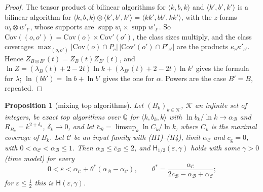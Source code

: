 \documentclass[11pt]{article}
\newtheorem{proposition}[theorem]{Proposition}
\theoremstyle{definition}
\theoremstyle{remark}
\providecommand{\eps}{\varepsilon}
\providecommand{\Q}{\mathbb{Q}}
\newcommand{\abs}[1]{\lvert #1\rvert}
\DeclareMathOperator{\supp}{supp}
\newcommand{\mat}[3]{\langle #1,#2,#3\rangle} %
\newcommand{\Hyp}{\mathsf{H}}                 %
\newcommand{\Hypk}[1]{\mathsf{H}_{#1}}        %
\newcommand{\Cov}{\mathrm{Cov}}               %
\newcommand{\ZB}{Z_B}                         %
\newcommand{\lamB}{\lambda_B}                 %
\newcommand{\cg}{c_{\mathrm g}}               %
\newcommand{\cbar}{\bar c}                    %
\newcommand{\Hcond}[1]{\textup{(H#1)}}        %
\begin{document}
\begin{proof}
The tensor product of bilinear algorithms for $\mat kbk$ and $\mat{k'}{b'}{k'}$ is a bilinear algorithm for $\mat kbk\otimes\mat{k'}{b'}{k'}=\mat{kk'}{bb'}{kk'}$, with the $z$-forms $w_l\otimes w'_{l'}$, whose supports are $\supp w_l\times\supp w'_{l'}$. So $\Cov((o,o'))=\Cov(o)\times\Cov'(o')$, the class sizes multiply, and the class coverages $\max_{(o,o')}\abs{\Cov(o)\cap P_c}\,\abs{\Cov'(o')\cap P'_{c'}}$ are the products $\kappa_c\kappa'_{c'}$. Hence $Z_{B\otimes B'}(t)=\ZB(t)Z_{B'}(t)$, and $\ln Z=(\lamB(t)+2-2t)\ln k+(\lambda_{B'}(t)+2-2t)\ln k'$ gives the formula for $\lambda$; $\ln(bb')=\ln b+\ln b'$ gives the one for $\alpha$. Powers are the case $B'=B$, repeated.
\end{proof}

\begin{proposition}[mixing top algorithms]\label{cp:C14}
Let $(B_k)_{k\in\mathcal K}$, $\mathcal K$ an infinite set of integers, be exact top algorithms over $\Q$ for $\mat k{b_k}k$ with $\ln b_k/\ln k\to\alpha_{\mathcal B}$ and $R_{B_k}=k^{2+\delta_k}$, $\delta_k\to0$, and let $\cbar_{\mathcal B}=\limsup_k\ln C_k/\ln k$, where $C_k$ is the maximal coverage of $B_k$. Let $\mathcal C$ be an input family with \Hcond1--\Hcond4, limit $\alpha_{\mathcal C}$ and $\cg=0$, with $0<\alpha_{\mathcal C}<\alpha_{\mathcal B}\le1$. Then $\alpha_{\mathcal B}\le\cbar_{\mathcal B}\le2$, and $\Hypk{1/2}(\eps,\gamma)$ holds with some $\gamma>0$ (time model) for every
\[
0<\eps<\alpha_{\mathcal C}+\theta^*(\alpha_{\mathcal B}-\alpha_{\mathcal C}),\qquad\theta^*=\frac{\alpha_{\mathcal C}}{2\cbar_{\mathcal B}-\alpha_{\mathcal B}+\alpha_{\mathcal C}};
\]
for $\eps\le\frac12$ this is $\Hyp(\eps,\gamma)$.
\end{proposition}
\end{document}
